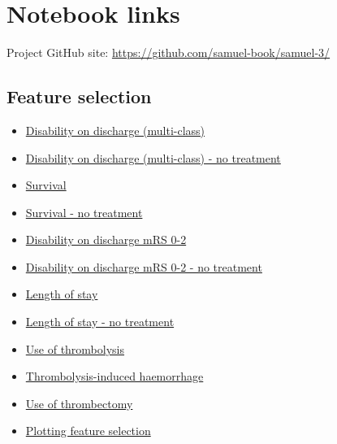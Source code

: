\section{Notebook links}

Project GitHub site: \url{https://github.com/samuel-book/samuel-3/}

\subsection{Feature selection}

\begin{itemize}
    \item \href{https://github.com/samuel-book/samuel-3/blob/main/3_machine_learning/3a_feature_selection/01_feature_selection_disability.ipynb}{Disability on discharge (multi-class)}
    \item \href{https://github.com/samuel-book/samuel-3/blob/main/3_machine_learning/3a_feature_selection/02_feature_selection_disability_no_treatment.ipynb}{Disability on discharge (multi-class) - no treatment}
    \item \href{https://github.com/samuel-book/samuel-3/blob/main/3_machine_learning/3a_feature_selection/09_feature_selection_disability_less_6.ipynb}{Survival}
    \item \href{https://github.com/samuel-book/samuel-3/blob/main/3_machine_learning/3a_feature_selection/11_feature_selection_disability_less_6_no_treatment.ipynb}{Survival - no treatment}
    \item \href{https://github.com/samuel-book/samuel-3/blob/main/3_machine_learning/3a_feature_selection/08_feature_selection_disability_less_3.ipynb}{Disability on discharge mRS 0-2}
    \item \href{https://github.com/samuel-book/samuel-3/blob/main/3_machine_learning/3a_feature_selection/10_feature_selection_disability_less_3_no_treatment.ipynb}{Disability on discharge mRS 0-2 - no treatment}
    \item \href{https://github.com/samuel-book/samuel-3/blob/main/3_machine_learning/3a_feature_selection/03_feature_selection_los.ipynb}{Length of stay}
    \item \href{https://github.com/samuel-book/samuel-3/blob/main/3_machine_learning/3a_feature_selection/04_feature_selection_los_no_treatmnent.ipynb}{Length of stay - no treatment}
    \item \href{https://github.com/samuel-book/samuel-3/blob/main/3_machine_learning/3a_feature_selection/05_feature_selection_thrombolysis.ipynb}{Use of thrombolysis}
    \item \href{https://github.com/samuel-book/samuel-3/blob/main/3_machine_learning/3a_feature_selection/07_feature_selection_thrombolysis_induced_haemorrhage.ipynb}{Thrombolysis-induced haemorrhage}
    \item \href{https://github.com/samuel-book/samuel-3/blob/main/3_machine_learning/3a_feature_selection/06_feature_selection_thrombectomy.ipynb}{Use of thrombectomy}
    \item \href{https://github.com/samuel-book/samuel-3/blob/main/3_machine_learning/3a_feature_selection/90_plot_feature_selection.ipynb}{Plotting feature selection}
\end{itemize}

